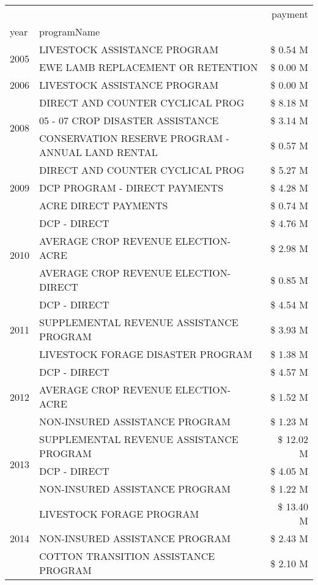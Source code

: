 \begin{tabular}{llr}
\toprule
 &  & payment \\
year & programName &  \\
\midrule
\multirow[t]{2}{*}{2005} & LIVESTOCK ASSISTANCE PROGRAM & \$ 0.54 M \\
 & EWE LAMB REPLACEMENT OR RETENTION & \$ 0.00 M \\
\cline{1-3}
2006 & LIVESTOCK ASSISTANCE PROGRAM & \$ 0.00 M \\
\cline{1-3}
\multirow[t]{3}{*}{2008} & DIRECT AND COUNTER CYCLICAL PROG & \$ 8.18 M \\
 & 05 - 07 CROP DISASTER ASSISTANCE & \$ 3.14 M \\
 & CONSERVATION RESERVE PROGRAM - ANNUAL LAND RENTAL & \$ 0.57 M \\
\cline{1-3}
\multirow[t]{3}{*}{2009} & DIRECT AND COUNTER CYCLICAL PROG & \$ 5.27 M \\
 & DCP PROGRAM - DIRECT PAYMENTS & \$ 4.28 M \\
 & ACRE DIRECT PAYMENTS & \$ 0.74 M \\
\cline{1-3}
\multirow[t]{3}{*}{2010} & DCP - DIRECT & \$ 4.76 M \\
 & AVERAGE CROP REVENUE ELECTION-ACRE & \$ 2.98 M \\
 & AVERAGE CROP REVENUE ELECTION-DIRECT & \$ 0.85 M \\
\cline{1-3}
\multirow[t]{3}{*}{2011} & DCP - DIRECT & \$ 4.54 M \\
 & SUPPLEMENTAL REVENUE ASSISTANCE PROGRAM & \$ 3.93 M \\
 & LIVESTOCK FORAGE DISASTER PROGRAM & \$ 1.38 M \\
\cline{1-3}
\multirow[t]{3}{*}{2012} & DCP - DIRECT & \$ 4.57 M \\
 & AVERAGE CROP REVENUE ELECTION-ACRE & \$ 1.52 M \\
 & NON-INSURED ASSISTANCE PROGRAM & \$ 1.23 M \\
\cline{1-3}
\multirow[t]{3}{*}{2013} & SUPPLEMENTAL REVENUE ASSISTANCE PROGRAM & \$ 12.02 M \\
 & DCP - DIRECT & \$ 4.05 M \\
 & NON-INSURED ASSISTANCE PROGRAM & \$ 1.22 M \\
\cline{1-3}
\multirow[t]{3}{*}{2014} & LIVESTOCK FORAGE PROGRAM & \$ 13.40 M \\
 & NON-INSURED ASSISTANCE PROGRAM & \$ 2.43 M \\
 & COTTON TRANSITION ASSISTANCE PROGRAM & \$ 2.10 M \\

\end{tabular}
